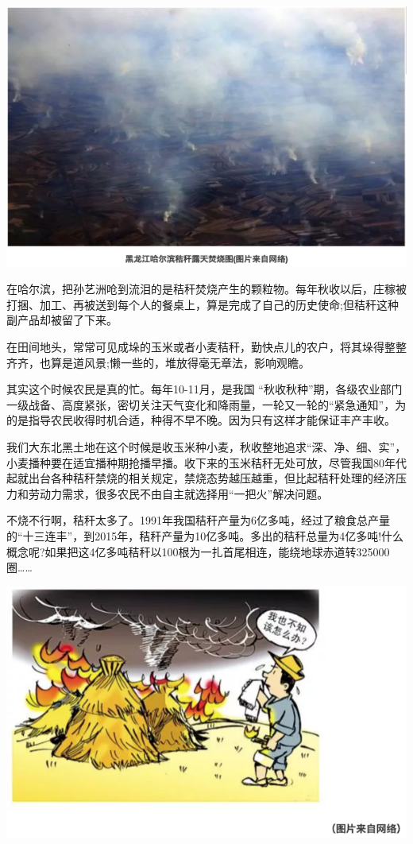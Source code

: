 \documentclass[]{book}
\begin{document}
\includegraphics[width=8.33in]{images/stalk1}

在哈尔滨，把孙艺洲呛到流泪的是秸秆焚烧产生的颗粒物。每年秋收以后，庄稼被打捆、加工、再被送到每个人的餐桌上，算是完成了自己的历史使命;但秸秆这种副产品却被留了下来。

在田间地头，常常可见成垛的玉米或者小麦秸秆，勤快点儿的农户，将其垛得整整齐齐，也算是道风景;懒一些的，堆放得毫无章法，影响观瞻。

其实这个时候农民是真的忙。每年10-11月，是我国
``秋收秋种''期，各级农业部门一级战备、高度紧张，密切关注天气变化和降雨量，一轮又一轮的``紧急通知''，为的是指导农民收得时机合适，种得不早不晚。因为只有这样才能保证丰产丰收。

我们大东北黑土地在这个时候是收玉米种小麦，秋收整地追求``深、净、细、实''，小麦播种要在适宜播种期抢播早播。收下来的玉米秸秆无处可放，尽管我国80年代起就出台各种秸秆禁烧的相关规定，禁烧态势越压越重，但比起秸秆处理的经济压力和劳动力需求，很多农民不由自主就选择用``一把火''解决问题。

不烧不行啊，秸秆太多了。1991年我国秸秆产量为6亿多吨，经过了粮食总产量的``十三连丰''，到2015年，秸秆产量为10亿多吨。多出的秸秆总量为4亿多吨!什么概念呢?如果把这4亿多吨秸秆以100根为一扎首尾相连，能绕地球赤道转325000圈\ldots{}\ldots{}

\includegraphics[width=8.33in]{images/stalk2}
\end{document}

